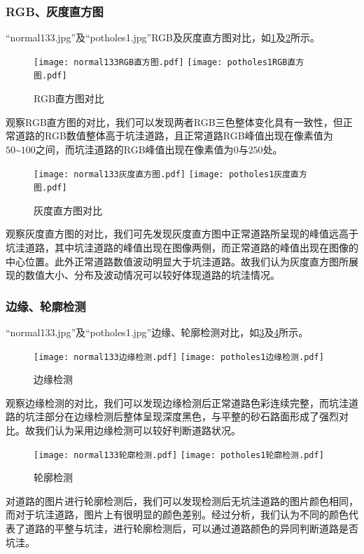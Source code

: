 \documentclass{MathorCupmodeling}
\begin{document}
	\subsubsection{RGB、灰度直方图}
	“normal133.jpg”及“potholes1.jpg”RGB及灰度直方图对比，如\textcolor{blue}{\cref{fig:RGB对比}}及\textcolor{blue}{\cref{fig:灰度对比}}所示。
	\begin{figure}[H]
		\centering
		\texttt{[image: normal133RGB直方图.pdf]}
		\hspace{0.3in}
		\texttt{[image: potholes1RGB直方图.pdf]}
		\caption{RGB直方图对比}
		\label{fig:RGB对比}
	\end{figure}

	观察RGB直方图的对比，我们可以发现两者RGB三色整体变化具有一致性，但正常道路的RGB数值整体高于坑洼道路，且正常道路RGB峰值出现在像素值为$50\text{\textasciitilde}100$之间，而坑洼道路的RGB峰值出现在像素值为$0$与$250$处。
	\begin{figure}[H]
		\centering
		\texttt{[image: normal133灰度直方图.pdf]}
		\hspace{0.3in}
		\texttt{[image: potholes1灰度直方图.pdf]}
		\caption{灰度直方图对比}
		\label{fig:灰度对比}
	\end{figure}
	观察灰度直方图的对比，我们可先发现灰度直方图中正常道路所呈现的峰值远高于坑洼道路，其中坑洼道路的峰值出现在图像两侧，而正常道路的峰值出现在图像的中心位置。此外正常道路数值波动明显大于坑洼道路。故我们认为灰度直方图所展现的数值大小、分布及波动情况可以较好体现道路的坑洼情况。
	
	\subsubsection{边缘、轮廓检测}
	“normal133.jpg”及“potholes1.jpg”边缘、轮廓检测对比，如\textcolor{blue}{\cref{fig:边缘检测}}及\textcolor{blue}{\cref{fig:轮廓检测}}所示。
	\begin{figure}[H]
		\centering
		\texttt{[image: normal133边缘检测.pdf]}
		\hspace{0.3in}
		\texttt{[image: potholes1边缘检测.pdf]}
		\caption{边缘检测}
		\label{fig:边缘检测}
	\end{figure}
	观察边缘检测的对比，我们可以发现边缘检测后正常道路色彩连续完整，而坑洼道路的坑洼部分在边缘检测后整体呈现深度黑色，与平整的砂石路面形成了强烈对比。故我们认为采用边缘检测可以较好判断道路状况。
	\begin{figure}[H]
		\centering
		\texttt{[image: normal133轮廓检测.pdf]}
		\hspace{0.3in}
		\texttt{[image: potholes1轮廓检测.pdf]}
		\caption{轮廓检测}
		\label{fig:轮廓检测}
	\end{figure}
	对道路的图片进行轮廓检测后，我们可以发现检测后无坑洼道路的图片颜色相同，而对于坑洼道路，图片上有很明显的颜色差别。经过分析，我们认为不同的颜色代表了道路的平整与坑洼，进行轮廓检测后，可以通过道路颜色的异同判断道路是否坑洼。
\end{document}
